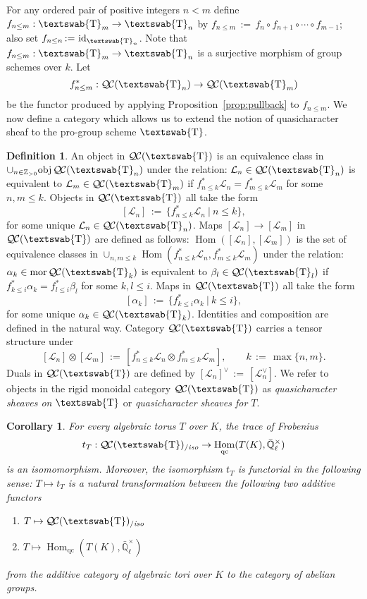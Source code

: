 \documentclass[11pt]{amsart}
\newcommand{\mathswab}[1]{\operatorname{\textswab{#1}}}
\theoremstyle{plain}
\newtheorem{corollary}[theorem]{Corollary}
\theoremstyle{definition}
\newtheorem{definition}[theorem]{Definition}
\theoremstyle{remark}
\newcommand{\ZZ}{{\mathbb{Z}}}
\newcommand{\EE}{\mathbb{\bar Q}_\ell}
\newcommand{\Fq}{k}
\newcommand{\EEx}{\EE^\times}
\DeclareMathOperator{\Hom}{Hom}
\DeclareMathOperator{\id}{id}
\newcommand{\ceq}{{\, :=\, }}
\newcommand{\tq}{{\ \vert\ }}
\newcommand{\obj}{{\text{obj}\, }}
\newcommand{\mor}{{\text{mor}\, }}
\newcommand{\GN}[1]{\mathswab{#1}}
\newcommand{\qcs}[1]{{\mathcal{#1}}}
\newcommand{\QC}{{\mathcal{Q\hskip-0.8pt C}}}
\newcommand{\QCiso}[1]{\QC(#1)_{/\textit{iso}}}
\newcommand{\trFrob}[1]{t_{#1}}
\begin{document}
For any  ordered pair of positive integers $n< m$ define 
$f_{n\leq m} : \GN{T}_{m} \to \GN{T}_{n}$ 
by $f_{n\leq m}\ceq f_n \circ f_{n+1} \circ \cdots \circ f_{m-1}$; 
also set $f_{n\leq n} \ceq \id_{\GN{T}_n}$.
Note that $f_{n\leq m}:  \GN{T}_{m} \to \GN{T}_{n}$ is a surjective morphism 
of group schemes over $\Fq$.
Let 
\[
f_{n\leq m}^* : \QC(\GN{T}_n) \to \QC(\GN{T}_{m})
\]
be the functor produced by applying Proposition~\ref{prop:pullback} to $f_{n\leq m}$.
We now define a category which allows us to extend the notion 
of quasicharacter sheaf to the pro-group scheme $\GN{T}$. 

\begin{definition}\label{def:catGN}
An object in $\QC(\GN{T})$ is an equivalence class in 
$\cup_{n\in\ZZ_{>0}} \obj \QC(\GN{T}_n)$ under the relation: 
$\qcs{L}_n\in \QC(\GN{T}_n)$ is equivalent to $\qcs{L}_{m}\in \QC(\GN{T}_m)$ 
if $f_{n\leq k}^* \qcs{L}_{n} = f_{m\leq k}^* \qcs{L}_m$ for some $n,m\leq k$. 
Objects in $\QC(\GN{T})$ all take the form
\[
[\qcs{L}_n] \ceq \{ f_{n\leq k}^* \qcs{L}_n \tq n\leq k\},
\]
for some unique $\qcs{L}_n \in \QC(\GN{T}_n)$.
Maps $[\qcs{L}_n] \to [\qcs{L}_m]$ in $\QC(\GN{T})$ are defined as follows:
$\Hom([\qcs{L}_n],[\qcs{L}_m])$ is the set of equivalence classes 
in $\cup_{n,m\leq k} \Hom(f_{n\leq k}^*\qcs{L}_n,f_{m\leq k}^*\qcs{L}_m)$ 
under the relation: $\alpha_k\in \mor \QC(\GN{T}_k)$ is equivalent to 
$\beta_l \in \QC(\GN{T}_l)$ if $f_{k\leq i}^*\alpha_k = f_{l\leq i}^* \beta_l$ for some $k,l\leq i$. 
Maps in $\QC(\GN{T})$ all take the form
\[
[\alpha_k] \ceq \{ f_{k\leq i}^* \alpha_k \tq k\leq i\},
\]
for some unique $\alpha_k \in \QC(\GN{T}_k)$.
Identities and composition are defined in the natural way.
Category $\QC(\GN{T})$ carries a tensor structure under
\[
[\qcs{L}_n]\otimes [\qcs{L}_m] \ceq [f_{n\leq k}^*\qcs{L}_n \otimes f_{m\leq k}^*\qcs{L}_m],
\qquad k \ceq \max\{ n,m\}.
\]
Duals in $\QC(\GN{T})$ are defined by $[\qcs{L}_n]^\vee \ceq [\qcs{L}_n^\vee]$.
We refer to objects in the rigid monoidal category 
$\QC(\GN{T})$ as \emph{quasicharacter sheaves on $\GN{T}$} 
or \emph{quasicharacter sheaves for $T$}.
\end{definition}



\begin{corollary}\label{cor:application}
For every algebraic torus $T$ over $K$, the trace of Frobenius 
  \[
\trFrob{T}:  \QCiso{\GN{T}} \to \Hom_{\text{qc}}(T(K),\EEx)
  \]
is an isomomorphism. 
Moreover, the isomorphism $\trFrob{T}$ is functorial in the following sense: 
$T \mapsto \trFrob{T}$ is a natural transformation 
between the following two additive functors
\begin{enumerate}
\item[$F_1$:] $T \mapsto \QCiso{\GN{T}}$
\item[$F_2$:] $T \mapsto \Hom_{\text{qc}}(T(K),\EEx)$
\end{enumerate}
from the additive category of algebraic tori over $K$ to the category of abelian groups.
\end{corollary}
\end{document}
